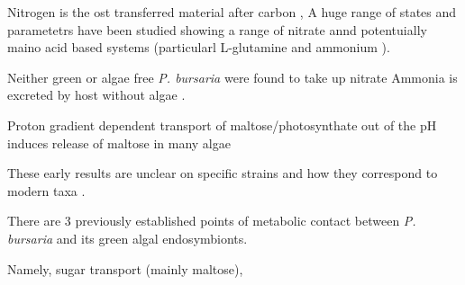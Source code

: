 {{Nitrogen is the ost transferred material after carbon \citep{Kato2009}, 
A huge range of states and parametetrs have been studied showing a range
of nitrate annd potentuially maino acid based systems (particularl L-glutamine and ammonium \citep{Albers1982}).


Neither green or algae free \textit{P. bursaria} were found to take up nitrate 
Ammonia is excreted by host without algae \citep{Albers1982}.


Proton gradient dependent transport of maltose/photosynthate out of the \citep{Schussler1992}
pH induces release of maltose in many algae \citep{}




These early results are unclear on specific strains and how they correspond
to modern taxa \citep{Kato2009}. 



%

%
%
%
%
%



There are 3 previously established points of metabolic contact between 
\textit{P. bursaria} and its green algal endosymbionts. 

Namely, sugar transport (mainly maltose), 

}}
